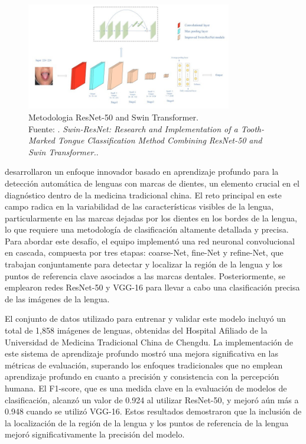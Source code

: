 \begin{figure}[H]
	\begin{center}
		\includegraphics[width=0.80\textwidth]{2/figures/1.jpeg}
		\caption[Metodologia ResNet-50 and Swin Transformer]{Metodologia ResNet-50 and Swin Transformer. \\
		Fuente: \cite{Zhao2024}. \textit{Swin-ResNet: Research and Implementation of a Tooth-Marked
		Tongue Classification Method Combining ResNet-50 and Swin Transformer.}.}
		\label{2:fig123}
	\end{center}
\end{figure}

\cite{Tang2020} desarrollaron un enfoque innovador basado en aprendizaje profundo para la detección automática de lenguas con marcas de dientes, un elemento crucial en el diagnóstico dentro de la medicina tradicional china. El reto principal en este campo radica en la variabilidad de las características visibles de la lengua, particularmente en las marcas dejadas por los dientes en los bordes de la lengua, lo que requiere una metodología de clasificación altamente detallada y precisa. Para abordar este desafío, el equipo implementó una red neuronal convolucional en cascada, compuesta por tres etapas: coarse-Net, fine-Net y refine-Net, que trabajan conjuntamente para detectar y localizar la región de la lengua y los puntos de referencia clave asociados a las marcas dentales. Posteriormente, se emplearon redes ResNet-50 y VGG-16 para llevar a cabo una clasificación precisa de las imágenes de la lengua.

El conjunto de datos utilizado para entrenar y validar este modelo incluyó un total de 1,858 imágenes de lenguas, obtenidas del Hospital Afiliado de la Universidad de Medicina Tradicional China de Chengdu. La implementación de este sistema de aprendizaje profundo mostró una mejora significativa en las métricas de evaluación, superando los enfoques tradicionales que no emplean aprendizaje profundo en cuanto a precisión y consistencia con la percepción humana. El F1-score, que es una medida clave en la evaluación de modelos de clasificación, alcanzó un valor de 0.924 al utilizar ResNet-50, y mejoró aún más a 0.948 cuando se utilizó VGG-16. Estos resultados demostraron que la inclusión de la localización de la región de la lengua y los puntos de referencia de la lengua mejoró significativamente la precisión del modelo.


